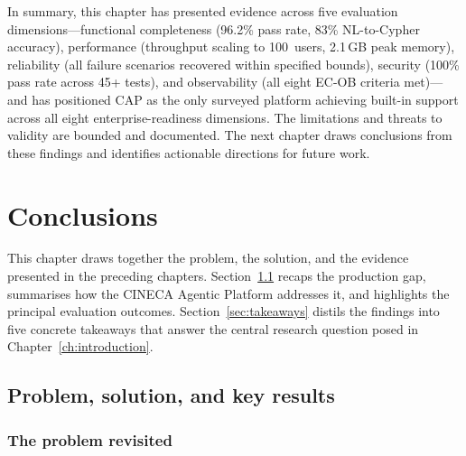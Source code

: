 \documentclass[a4paper,noexaminfo]{sapthesis}
\begin{document}
\medskip
\noindent
In summary, this chapter has presented evidence across five evaluation
dimensions---functional completeness (96.2\% pass rate, 83\%
NL-to-Cypher accuracy), performance (throughput scaling to 100~users,
2.1\,GB peak memory), reliability (all failure scenarios recovered
within specified bounds), security (100\% pass rate across 45+ tests),
and observability (all eight EC-OB criteria met)---and has positioned
CAP as the only surveyed platform achieving built-in support across all
eight enterprise-readiness dimensions.  The limitations and threats to
validity are bounded and documented.  The next chapter draws
conclusions from these findings and identifies actionable directions for
future work.


\chapter{Conclusions}
\label{ch:conclusions}

This chapter draws together the problem, the solution, and the evidence
presented in the preceding chapters.  Section~\ref{sec:recap} recaps the
production gap, summarises how the CINECA Agentic Platform addresses it,
and highlights the principal evaluation outcomes.
Section~\ref{sec:takeaways} distils the findings into five concrete
takeaways that answer the central research question posed in
Chapter~\ref{ch:introduction}.

\section{Problem, solution, and key results}
\label{sec:recap}

\subsection{The problem revisited}
\end{document}
